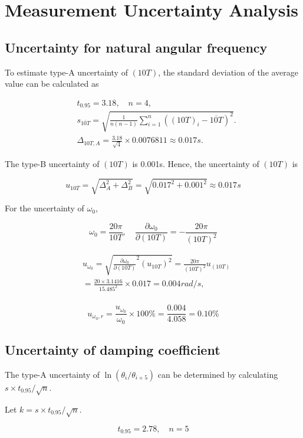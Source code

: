 \section{Measurement Uncertainty Analysis}

\subsection{Uncertainty for natural angular frequency}

To estimate type-A uncertainty of $(10T)$,
the standard deviation of the average value can be calculated as

\[
\begin{split}
&t_{0.95}=3.18,\quad n=4,\\
&s_{\overline{10T}}=\sqrt{\frac{1}{n(n-1)}\sum_{i=1}^n((10T)_i-\overline{10T})^2}.\\ 
&\Delta_{10T,A}=\frac{3.18}{\sqrt{4}}\times0.0076811\approx 0.017s.
\end{split}
\]

The type-B uncertainty of $(10T)$ is 0.001s. Hence, the uncertainty of $(10T)$ is

$$ u_{10T}=\sqrt{\Delta_A^2+\Delta_B^2}=\sqrt{0.017^2+0.001^2}\approx 0.017s $$  

For the uncertainty of $\omega_0$,

$$\omega_0=\frac{20\pi}{10T},\quad \frac{\partial \omega_0}{\partial
  (10T)}=-\frac{20\pi}{(10T)^2}$$ 

\[
\begin{split}
&u_{\omega_0}=\sqrt{\frac{\partial \omega_0}{\partial
    (10T)}^2(u_{10T})^2}=\frac{20\pi}{(10T)^2}u_{(10T)}\\
&=\frac{20\times3.1416}{15.485^2} \times 0.017 = 0.004rad/s,\\  
\end{split}
\]

$$ u_{\omega_0,r}=\frac{u_{\omega_0}}{\omega_0}\times100\%
=\frac{0.004}{4.058}=0.10\% $$ 

\subsection{Uncertainty of damping coefficient}

The type-A uncertainty of $\ln(\theta_i/\theta_{i+5})$ can be determined by
calculating $s\times t_{0.95}/\sqrt{n}$.

Let $k = s \times t_{0.95}/\sqrt{n}$.


$$ t_{0.95}=2.78,\quad n=5$$ 

